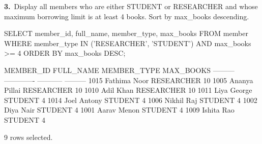\noindent\begin{minipage}{\linewidth}
\begingroup{}
{\fontsize{14}{17}\selectfont\textbf{3.}}\ Display all members who are either STUDENT or RESEARCHER and whose maximum borrowing limit is at least 4 books. Sort by max\_books descending.\par
\endgroup\vspace{12pt}


\begin{sqlcode}
SELECT member_id, full_name, member_type, max_books
FROM member
WHERE member_type IN ('RESEARCHER', 'STUDENT')
  AND max_books >= 4
ORDER BY max_books DESC;
\end{sqlcode}

\vspace{18pt}


\begin{sqlout}[fontsize=\small]
MEMBER_ID  FULL_NAME      MEMBER_TYPE  MAX_BOOKS
---------  -------------  -----------  ---------
     1015  Fathima Noor   RESEARCHER          10
     1005  Ananya Pillai  RESEARCHER          10
     1010  Adil Khan      RESEARCHER          10
     1011  Liya George    STUDENT              4
     1014  Joel Antony    STUDENT              4
     1006  Nikhil Raj     STUDENT              4
     1002  Diya Nair      STUDENT              4
     1001  Aarav Menon    STUDENT              4
     1009  Ishita Rao     STUDENT              4

9 rows selected.
\end{sqlout}
\end{minipage}\par\vspace{24pt}

